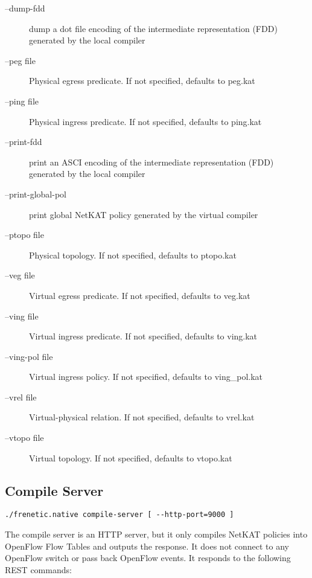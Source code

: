 \begin{description}
\item[--dump-fdd]          dump a dot file encoding of the intermediate
                        representation (FDD) generated by the local compiler
\item[--peg file]          Physical egress predicate. If not specified, defaults to
                        peg.kat
\item[--ping file]         Physical ingress predicate. If not specified, defaults
                        to ping.kat
\item[--print-fdd]         print an ASCI encoding of the intermediate
                        representation (FDD) generated by the local compiler
\item[--print-global-pol]  print global NetKAT policy generated by the virtual
                        compiler
\item[--ptopo file]        Physical topology. If not specified, defaults to
                        ptopo.kat
\item[--veg file]          Virtual egress predicate. If not specified, defaults to
                        veg.kat
\item[--ving file]         Virtual ingress predicate. If not specified, defaults to
                        ving.kat
\item[--ving-pol file]     Virtual ingress policy. If not specified, defaults to
                        ving\_pol.kat
\item[--vrel file]         Virtual-physical relation. If not specified, defaults to
                        vrel.kat
\item[--vtopo file]        Virtual topology. If not specified, defaults to
                        vtopo.kat
\end{description}


\subsection{Compile Server}

\begin{verbatim}
./frenetic.native compile-server [ --http-port=9000 ] 
\end{verbatim}

The compile server is an HTTP server, but it only compiles NetKAT policies into OpenFlow Flow Tables 
and outputs the response.  It does not connect to any OpenFlow switch or pass back OpenFlow events.  
It responds to the following REST commands:

